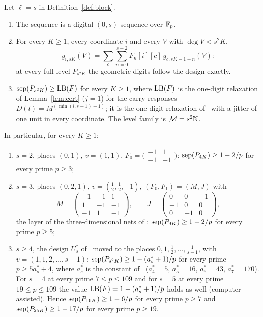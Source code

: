 \begin{theorem}\label{thm:block}
Let $\ell=s$ in Definition~\ref{def:block}.
\begin{enumerate}
\item[(i)] The sequence is a digital $(0,s)$-sequence over $\mathbb{F}_p$.
\item[(ii)] For every $K\ge1$, every coordinate $i$ and every $V$ with $\deg V<s^2K$,
\[
y_{i,sK}(V)=\sum_c\sum_{n=0}^{s-2}F_n[i][c]\,y_{c,sK-1-n}(V):
\]
at every full level $P_{s^2K}$ the geometric digits follow the design exactly.
\item[(iii)] $\operatorname{sep}(P_{s^2K})\ge\mathrm{LB}(F)$ for every $K\ge1$, where $\mathrm{LB}(F)$ is the one-digit relaxation of Lemma~\ref{lem:cert} ($j=1$) for the carry responses $D(l)=M^{(\min(l,s-1)-1)}$; it is the one-digit relaxation of \cite{Gru26geo}%
\ with a jitter of one unit in every coordinate. The level family is $\mathcal{M}=s^2\mathbb{N}$.
\end{enumerate}
In particular, for every $K\ge1$:
\begin{enumerate}
\item[(a)] $s=2$, places $(0,1)$, $v=(1,1)$, $F_0=\bigl(\begin{smallmatrix}-1&1\\-1&-1\end{smallmatrix}\bigr)$: $\operatorname{sep}(P_{4K})\ge1-2/p$ for every prime $p\ge3$;
\item[(b)] $s=3$, places $(0,2,1)$, $v=(\frac12,\frac12,-1)$, $(F_0,F_1)=(M,J)$ with
\[
M=\begin{pmatrix}-1&-1&1\\1&-1&-1\\-1&1&-1\end{pmatrix},\qquad J=\begin{pmatrix}0&0&-1\\-1&0&0\\0&-1&0\end{pmatrix},
\]
the layer of the three-dimensional nets of \cite{Gru26geo}%
: $\operatorname{sep}(P_{9K})\ge1-2/p$ for every prime $p\ge5$;
\item[(c)] $s\ge4$, the design $U^*_s$ of \cite{Gru26geo}%
\ moved to the places $0,1,\frac12,\dots,\frac1{s-1}$, with $v=(1,1,2,\dots,s-1)$: $\operatorname{sep}(P_{s^2K})\ge1-(a^*_s+1)/p$ for every prime $p\ge5a^*_s+4$, where $a^*_s$ is the constant of \cite{Gru26geo}%
\ ($a^*_4=5$, $a^*_5=16$, $a^*_6=43$, $a^*_7=170$). For $s=4$ at every prime $7\le p\le109$ and for $s=5$ at every prime $19\le p\le109$ the value $\mathrm{LB}(F)=1-(a^*_s+1)/p$ holds as well (computer-assisted). Hence $\operatorname{sep}(P_{16K})\ge1-6/p$ for every prime $p\ge7$ and $\operatorname{sep}(P_{25K})\ge1-17/p$ for every prime $p\ge19$.

\end{enumerate}
\end{theorem}
